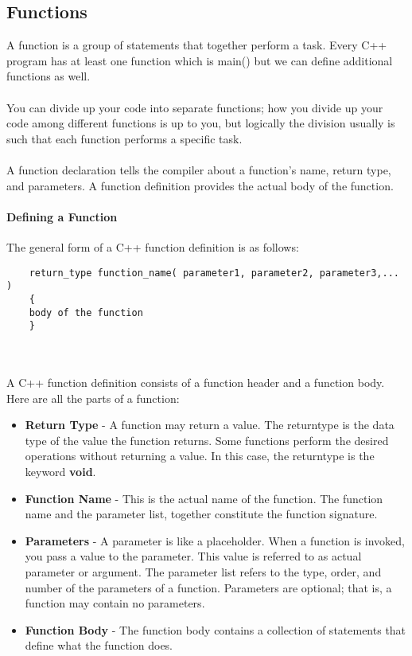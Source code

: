 \documentclass[11pt,fleqn]{book} %
\begin{document}
	\subsection{Functions}
	A function is a group of statements that together perform a task. Every C++ program has at least one function which is main() but we can define additional functions as well.\\ ~\\ 
	You can divide up your code into separate functions; how you divide up your code among different functions is up to you, but logically the division usually is such that each function performs a specific task. ~\\ ~\\
	A function declaration tells the compiler about a function's name, return type, and parameters. A function definition provides the actual body of the function.
	\paragraph{Defining a Function}
	The general form of a C++ function definition is as follows:
	\begin{lstlisting}
	return_type function_name( parameter1, parameter2, parameter3,... ) 
	{
	body of the function
	}
	\end{lstlisting} ~\\ ~\\
	A C++ function definition consists of a function header and a function body. Here are all the parts of a function: ~\\
	\begin{itemize}
		\item \textbf{Return Type} - A function may return a value. The return\textunderscore type is the data type of the value the function returns. Some functions perform the desired operations without returning a value. In this case, the return\textunderscore type is the keyword \textbf{void}. \\
		\item \textbf{Function Name} - This is the actual name of the function. The function name and the parameter list, together constitute the function signature.\\
		\item \textbf{Parameters} - A parameter is like a placeholder. When a function is invoked, you pass a value to the parameter. This value is referred to as actual parameter or argument. The parameter list refers to the type, order, and number of the parameters of a function. Parameters are optional; that is, a function may contain no parameters.\\
		\item \textbf{Function Body} - The function body contains a collection of statements that define what the function does. ~\\
	\end{itemize}
	
\end{document}
